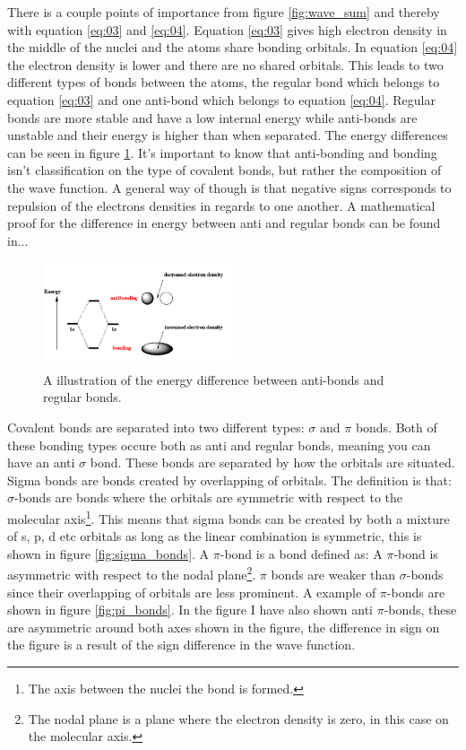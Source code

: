 \documentclass[jmp, amsmath, amssymb, reprint]{article}
\numberwithin{equation}{section}
\begin{document}
\begin{multicols}{2}
There is a couple points of importance from figure \ref{fig:wave_sum} and thereby with equation \ref{eq:03} and \ref{eq:04}. Equation \ref{eq:03} gives high electron density in the middle of the nuclei and the atoms share bonding orbitals. In equation \ref{eq:04} the electron density is lower and there are no shared orbitals. This leads to two different types of bonds between the atoms, the regular bond which belongs to equation \ref{eq:03} and one anti-bond which belongs to equation \ref{eq:04}. Regular bonds are more stable and have a low internal energy while anti-bonds are unstable and their energy is higher than when separated. The energy differences can be seen in figure \ref{fig:bond_energy}. It's important to know that anti-bonding and bonding isn't classification on the type of covalent bonds, but rather the composition of the wave function. A general way of though is that negative signs corresponds to repulsion of the electrons densities in regards to one another. A mathematical proof for the difference in energy between anti and regular bonds can be found in...

\begin{figure}[H]
	\centering
  	\includegraphics[width=0.50\textwidth]{anti_bond_energy.png}
	\caption{A illustration of the energy difference between anti-bonds and regular bonds.}
	\label{fig:bond_energy}
\end{figure}

Covalent bonds are separated into two different types: \(\sigma\) and \(\pi\) bonds. Both of these bonding types occure both as anti and regular bonds, meaning you can have an anti \(\sigma\) bond. These bonds are separated by how the orbitals are situated. Sigma bonds are bonds created by overlapping of orbitals. The definition is that: \(\sigma\)-bonds are bonds where the orbitals are symmetric with respect to the molecular axis\footnote{The axis between the nuclei the bond is formed.}. This means that sigma bonds can be created by both a mixture of s, p, d etc orbitals as long as the linear combination is symmetric, this is shown in figure \ref{fig:sigma_bonds}. A \(\pi\)-bond is a bond defined as: A \(\pi\)-bond is asymmetric with respect to the nodal plane\footnote{The nodal plane is a plane where the electron density is zero, in this case on the molecular axis.}. \(\pi\) bonds are weaker than \(\sigma\)-bonds since their overlapping of orbitals are less prominent. A example of \(\pi\)-bonds are shown in figure \ref{fig:pi_bonds}. In the figure I have also shown anti \(\pi\)-bonds, these are asymmetric around both axes shown in the figure, the difference in sign on the figure is a result of the sign difference in the wave function.



\end{multicols}
\end{document}
